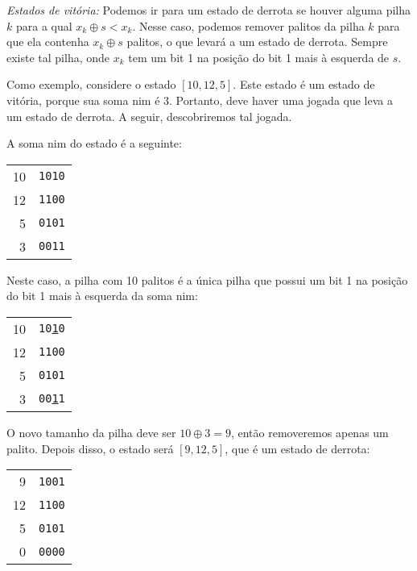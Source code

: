 \textit{Estados de vitória:} Podemos ir para um estado de derrota se houver alguma pilha $k$ para a qual $x_k \oplus s < x_k$. Nesse caso, podemos remover palitos da pilha $k$ para que ela contenha $x_k \oplus s$ palitos, o que levará a um estado de derrota. Sempre existe tal pilha, onde $x_k$ tem um bit 1 na posição do bit 1 mais à esquerda de $s$.

Como exemplo, considere o estado $[10,12,5]$. Este estado é um estado de vitória, porque sua soma nim é 3. Portanto, deve haver uma jogada que leva a um estado de derrota. A seguir, descobriremos tal jogada.

A soma nim do estado é a seguinte:

\begin{center}
\begin{tabular}{r|r}
10 & \texttt{1010} \\
12 & \texttt{1100} \\
5 & \texttt{0101} \\
\hline
3 & \texttt{0011} \\
\end{tabular}
\end{center}

Neste caso, a pilha com 10 palitos é a única pilha que possui um bit 1 na posição do bit 1 mais à esquerda da soma nim:

\begin{center}
\begin{tabular}{r|r}
10 & \texttt{10\underline{1}0} \\
12 & \texttt{1100} \\
5 & \texttt{0101} \\
\hline
3 & \texttt{00\underline{1}1} \\
\end{tabular}
\end{center}

O novo tamanho da pilha deve ser $10 \oplus 3 = 9$, então removeremos apenas um palito. Depois disso, o estado será $[9,12,5]$, que é um estado de derrota:

\begin{center}
\begin{tabular}{r|r}
9 & \texttt{1001} \\
12 & \texttt{1100} \\
5 & \texttt{0101} \\
\hline
0 & \texttt{0000} \\
\end{tabular}
\end{center}

